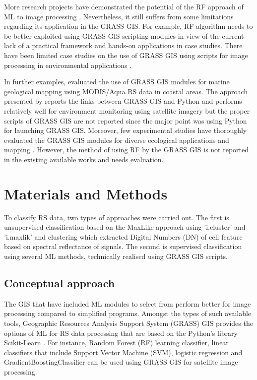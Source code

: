 \documentclass[eprint,
approc,		%
]{actapoly}
\begin{document}
More research projects have demonstrated the potential of the RF approach of ML to image processing \citep{COLLINS2020111839,WEI2020112005,WANG202294}. Nevertheless, it still suffers from some limitations regarding its application in the GRASS GIS. For example, RF algorithm needs to be better exploited using GRASS GIS scripting modules in view of the current lack of a practical framework and hands-on applications in case studies. There have been limited case studies on the use of GRASS GIS using scripts for image processing in environmental applications \citep{STRIGARO201668,geomatics5010005,ROCCHINI2017166,7326254}. 

In further examples, \citep{7326254} evaluated the use of GRASS GIS modules for marine geological mapping using MODIS/Aqua RS data in coastal areas. The approach presented by \citep{6407912} reports the links between GRASS GIS and Python and performs relatively well for environment monitoring using satellite imagery but the proper scripts of GRASS GIS are not reported since the major point was using Python for launching GRASS GIS. Moreover, few experimental studies have thoroughly evaluated the GRASS GIS modules for diverse ecological applications and mapping \citep{lemenkova2024exploitation}. However, the method of using RF by the GRASS GIS is not reported in the existing available works and needs evaluation.

\section{Materials and Methods}

To classify RS data, two types of approaches were carried out. The first is unsupervised classification based on the MaxLike approach using 'i.cluster' and 'i.maxlik' and clustering which extracted Digital Numbers (DN) of cell feature based on spectral reflectance of signals. The second is supervised classification using several ML methods, technically realised using GRASS GIS scripts.

\subsection{Conceptual approach}
The GIS that have included ML modules to select from perform better for image processing compared to simplified programs. Amongst the types of such available tools, Geographic Resources Analysis Support System (GRASS) GIS provides the options of ML for RS data processing that are based on the Python's library Scikit-Learn \citep{scikitlearn}. For instance, Random Forest (RF) learning classifier, linear classifiers that include Support Vector Machine (SVM), logistic regression and GradientBoostingClassifier can be used using GRASS GIS for satellite image processing. 
\end{document}
